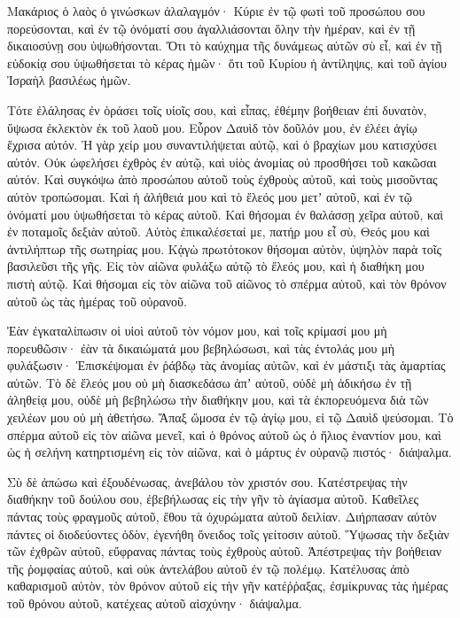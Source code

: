 \begin{spacing}{1.1}
\begin{multicols}{2}
Μακάριος ὁ λαὸς ὁ γινώσκων ἀλαλαγμόν· Κύριε ἐν τῷ φωτὶ τοῦ προσώπου σου πορεύσονται,
καὶ ἐν τῷ ὀνόματί σου ἀγαλλιάσονται ὅλην τὴν ἡμέραν, καὶ ἐν τῇ δικαιοσύνῃ σου ὑψωθήσονται.
Ὅτι τὸ καύχημα τῆς δυνάμεως αὐτῶν σὺ εἶ, καὶ ἐν τῇ εὐδοκίᾳ σου ὑψωθήσεται τὸ κέρας ἡμῶν·
ὅτι τοῦ Κυρίου ἡ ἀντίληψις, καὶ τοῦ ἁγίου Ἰσραὴλ βασιλέως ἡμῶν.

Τότε ἐλάλησας ἐν ὁράσει τοῖς υἱοῖς σου, καὶ εἶπας, ἐθέμην βοήθειαν ἐπὶ δυνατὸν, ὕψωσα ἐκλεκτὸν ἐκ τοῦ λαοῦ μου.
Εὗρον Δαυὶδ τὸν δοῦλόν μου, ἐν ἐλέει ἁγίῳ ἔχρισα αὐτόν.
Ἡ γὰρ χείρ μου συναντιλήψεται αὐτῷ, καὶ ὁ βραχίων μου κατισχύσει αὐτόν.
Οὐκ ὠφελήσει ἐχθρὸς ἐν αὐτῷ, καὶ υἱὸς ἀνομίας οὐ προσθήσει τοῦ κακῶσαι αὐτόν.
Καὶ συγκόψω ἀπὸ προσώπου αὐτοῦ τοὺς ἐχθροὺς αὐτοῦ, καὶ τοὺς μισοῦντας αὐτὸν τροπώσομαι.
Καὶ ἡ ἀλήθειά μου καὶ τὸ ἔλεός μου μετʼ αὐτοῦ, καὶ ἐν τῷ ὀνόματί μου ὑψωθήσεται τὸ κέρας αὐτοῦ.
Καὶ θήσομαι ἐν θαλάσσῃ χεῖρα αὐτοῦ, καὶ ἐν ποταμοῖς δεξιὰν αὐτοῦ.
Αὐτὸς ἐπικαλέσεταί με, πατήρ μου εἶ σὺ, Θεός μου καὶ ἀντιλήπτωρ τῆς σωτηρίας μου.
Κᾀγὼ πρωτότοκον θήσομαι αὐτὸν, ὑψηλὸν παρὰ τοῖς βασιλεῦσι τῆς γῆς.
Εἰς τὸν αἰῶνα φυλάξω αὐτῷ τὸ ἔλεός μου, καὶ ἡ διαθήκη μου πιστὴ αὐτῷ.
Καὶ θήσομαι εἰς τὸν αἰῶνα τοῦ αἰῶνος τὸ σπέρμα αὐτοῦ, καὶ τὸν θρόνον αὐτοῦ ὡς τὰς ἡμέρας τοῦ οὐρανοῦ.

Ἐὰν ἐγκαταλίπωσιν οἱ υἱοὶ αὐτοῦ τὸν νόμον μου, καὶ τοῖς κρίμασί μου μὴ πορευθῶσιν·
ἐὰν τὰ δικαιώματά μου βεβηλώσωσι, καὶ τὰς ἐντολάς μου μὴ φυλάξωσιν·
Ἐπισκέψομαι ἐν ῥάβδῳ τὰς ἀνομίας αὐτῶν, καὶ ἐν μάστιξι τὰς ἁμαρτίας αὐτῶν.
Τὸ δὲ ἔλεός μου οὐ μὴ διασκεδάσω ἀπʼ αὐτοῦ, οὐδὲ μὴ ἀδικήσω ἐν τῇ ἀληθείᾳ μου,
οὐδὲ μὴ βεβηλώσω τὴν διαθήκην μου, καὶ τὰ ἐκπορευόμενα διὰ τῶν χειλέων μου οὐ μὴ ἀθετήσω.
Ἅπαξ ὤμοσα ἐν τῷ ἁγίῳ μου, εἰ τῷ Δαυὶδ ψεύσομαι.
Τὸ σπέρμα αὐτοῦ εἰς τὸν αἰῶνα μενεῖ, καὶ ὁ θρόνος αὐτοῦ ὡς ὁ ἥλιος ἐναντίον μου,
καὶ ὡς ἡ σελήνη κατηρτισμένη εἰς τὸν αἰῶνα, καὶ ὁ μάρτυς ἐν οὐρανῷ πιστός· διάψαλμα.

Σὺ δὲ ἀπώσω καὶ ἐξουδένωσας, ἀνεβάλου τὸν χριστόν σου.
Κατέστρεψας τὴν διαθήκην τοῦ δούλου σου, ἐβεβήλωσας εἰς τὴν γῆν τὸ ἁγίασμα αὐτοῦ.
Καθεῖλες πάντας τοὺς φραγμοῦς αὐτοῦ, ἔθου τὰ ὀχυρώματα αὐτοῦ δειλίαν.
Διήρπασαν αὐτὸν πάντες οἱ διοδεύοντες ὁδὸν, ἐγενήθη ὄνειδος τοῖς γείτοσιν αὐτοῦ.
Ὕψωσας τὴν δεξιὰν τῶν ἐχθρῶν αὐτοῦ, εὔφρανας πάντας τοὺς ἐχθροὺς αὐτοῦ.
Ἀπέστρεψας τὴν βοήθειαν τῆς ῥομφαίας αὐτοῦ, καὶ οὐκ ἀντελάβου αὐτοῦ ἐν τῷ πολέμῳ.
Κατέλυσας ἀπὸ καθαρισμοῦ αὐτὸν, τὸν θρόνον αὐτοῦ εἰς τὴν γῆν κατέῤῥαξας,
ἐσμίκρυνας τὰς ἡμέρας τοῦ θρόνου αὐτοῦ, κατέχεας αὐτοῦ αἰσχύνην· διάψαλμα.


\end{multicols}
\end{spacing}
